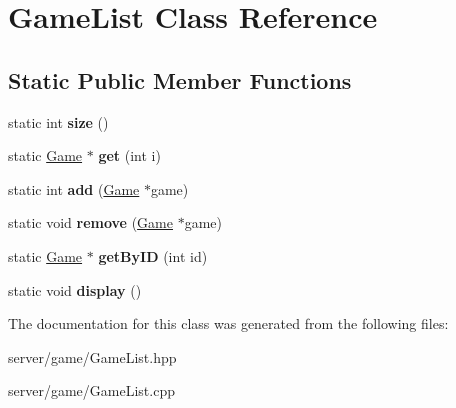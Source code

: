\hypertarget{class_game_list}{\section{Game\-List Class Reference}
\label{class_game_list}
}
\subsection*{Static Public Member Functions}
\begin{DoxyCompactItemize}
\item 
\hypertarget{class_game_list_a918cead37b9d4727f0515765130ab257}{static int {\bfseries size} ()}\label{class_game_list_a918cead37b9d4727f0515765130ab257}

\item 
\hypertarget{class_game_list_aaebd8d8d22b9c7476e53a2bbfb54b041}{static \hyperlink{class_game}{Game} $\ast$ {\bfseries get} (int i)}\label{class_game_list_aaebd8d8d22b9c7476e53a2bbfb54b041}

\item 
\hypertarget{class_game_list_a40965fb355d63074209c1540a3d0f725}{static int {\bfseries add} (\hyperlink{class_game}{Game} $\ast$game)}\label{class_game_list_a40965fb355d63074209c1540a3d0f725}

\item 
\hypertarget{class_game_list_ae1afa80384e108c60d6bfdc0648f2cdd}{static void {\bfseries remove} (\hyperlink{class_game}{Game} $\ast$game)}\label{class_game_list_ae1afa80384e108c60d6bfdc0648f2cdd}

\item 
\hypertarget{class_game_list_a25f1bf4c2f77420c734c912008376c1a}{static \hyperlink{class_game}{Game} $\ast$ {\bfseries get\-By\-I\-D} (int id)}\label{class_game_list_a25f1bf4c2f77420c734c912008376c1a}

\item 
\hypertarget{class_game_list_ad8ed3a25590920633f78d9ef95b66feb}{static void {\bfseries display} ()}\label{class_game_list_ad8ed3a25590920633f78d9ef95b66feb}

\end{DoxyCompactItemize}


The documentation for this class was generated from the following files\-:\begin{DoxyCompactItemize}
\item 
server/game/Game\-List.\-hpp\item 
server/game/Game\-List.\-cpp\end{DoxyCompactItemize}
